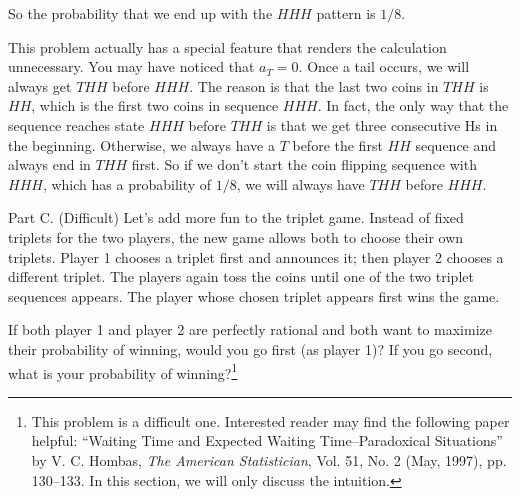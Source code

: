 \begin{solution}
So the probability that we end up with the $HHH$ pattern is $1/8$.

This problem actually has a special feature that renders the calculation unnecessary. You may have
noticed that $a_T=0$. Once a tail occurs, we will always get $THH$ before $HHH$. The reason is that the
last two coins in $THH$ is $HH$, which is the first two coins in sequence $HHH$. In fact, the only way
that the sequence reaches state $HHH$ before $THH$ is that we get three consecutive Hs in the
beginning. Otherwise, we always have a $T$ before the first $HH$ sequence and always end in $THH$
first. So if we don't start the coin flipping sequence with $HHH$, which has a probability of $1/8$,
we will always have $THH$ before $HHH$.

\end{solution}

\begin{problem}{Part C. (Difficult)}
Let's add more fun to the triplet game. Instead of fixed triplets for the two players, the new game
allows both to choose their own triplets. Player 1 chooses a triplet first and announces it; then player
2 chooses a different triplet. The players again toss the coins until one of the two triplet sequences
appears. The player whose chosen triplet appears first wins the game.


If both player 1 and player 2 are perfectly rational and both want to maximize their probability of
winning, would you go first (as player 1)? If you go second, what is your probability of winning?\footnote[3]{This problem is a difficult one. Interested reader may find the following paper helpful: ``Waiting Time and Expected Waiting Time--Paradoxical Situations'' by V. C. Hombas, \textit{The American Statistician}, Vol. 51, No. 2 (May, 1997), pp. 130--133. In this section, we will only discuss the intuition.}
\end{problem}

